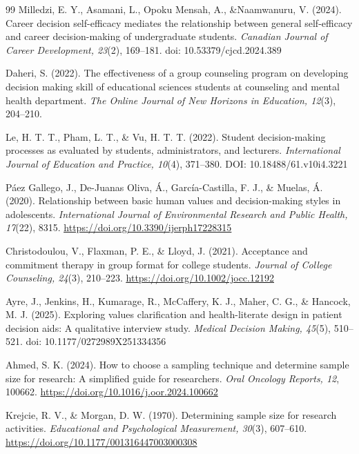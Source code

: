 \documentclass[10pt]{NSP1}
\providecommand{\ul}[1]{\underline{#1}}
\begin{document}
\begin{thebibliography}{99}
 Milledzi, E. Y., Asamani, L., Opoku Mensah, A., \&Naamwanuru, V. (2024). Career decision self-efficacy mediates the relationship between general self-efficacy and career decision-making of undergraduate students. \emph{Canadian Journal of Career Development, 23}(2), 169--181. doi: 10.53379/cjcd.2024.389

 Daheri, S. (2022). The effectiveness of a group counseling program on developing decision making skill of educational sciences students at counseling and mental health department. \emph{The Online Journal of New Horizons in Education, 12}(3), 204--210.

 Le, H. T. T., Pham, L. T., \& Vu, H. T. T. (2022). Student decision-making processes as evaluated by students, administrators, and lecturers. \emph{International Journal of Education and Practice, 10}(4), 371--380. DOI: 10.18488/61.v10i4.3221

 Páez Gallego, J., De-Juanas Oliva, Á., García-Castilla, F. J., \& Muelas, Á. (2020). Relationship between basic human values and decision-making styles in adolescents. \emph{International Journal of Environmental Research and Public Health, 17}(22), 8315. \href{https://doi.org/10.3390/ijerph17228315}{\ul{https://doi.org/10.3390/ijerph17228315}}

 Christodoulou, V., Flaxman, P. E., \& Lloyd, J. (2021). Acceptance and commitment therapy in group format for college students. \emph{Journal of College Counseling, 24}(3), 210--223. \href{https://doi.org/10.1002/jocc.12192}{\ul{https://doi.org/10.1002/jocc.12192}}

 Ayre, J., Jenkins, H., Kumarage, R., McCaffery, K. J., Maher, C. G., \& Hancock, M. J. (2025). Exploring values clarification and health-literate design in patient decision aids: A qualitative interview study. \emph{Medical Decision Making, 45}(5), 510--521. doi: 10.1177/0272989X251334356

 Ahmed, S. K. (2024). How to choose a sampling technique and determine sample size for research: A simplified guide for researchers. \emph{Oral Oncology Reports, 12}, 100662. \url{https://doi.org/10.1016/j.oor.2024.100662}

 Krejcie, R. V., \& Morgan, D. W. (1970). Determining sample size for research activities. \emph{Educational and Psychological Measurement, 30}(3), 607--610. \url{https://doi.org/10.1177/001316447003000308}

\end{thebibliography}
\end{document}
